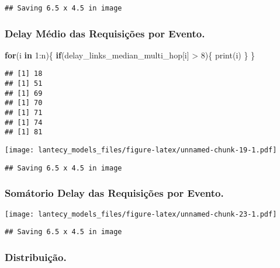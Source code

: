 \documentclass[
]{article}
\newenvironment{Shaded}{\begin{snugshade}}{\end{snugshade}}
\newcommand{\ControlFlowTok}[1]{\textcolor[rgb]{0.13,0.29,0.53}{\textbf{#1}}}
\newcommand{\DecValTok}[1]{\textcolor[rgb]{0.00,0.00,0.81}{#1}}
\newcommand{\FunctionTok}[1]{\textcolor[rgb]{0.00,0.00,0.00}{#1}}
\newcommand{\NormalTok}[1]{#1}
\newcommand{\SpecialCharTok}[1]{\textcolor[rgb]{0.00,0.00,0.00}{#1}}
\begin{document}
\begin{verbatim}
## Saving 6.5 x 4.5 in image
\end{verbatim}

\hypertarget{delay-muxe9dio-das-requisiuxe7uxf5es-por-evento.}{%
\subsubsection{Delay Médio das Requisições por
Evento.}\label{delay-muxe9dio-das-requisiuxe7uxf5es-por-evento.}}

\begin{Shaded}
\begin{Highlighting}[]
\ControlFlowTok{for}\NormalTok{(i }\ControlFlowTok{in} \DecValTok{1}\SpecialCharTok{:}\NormalTok{n)\{}
  \ControlFlowTok{if}\NormalTok{(delay\_links\_median\_multi\_hop[i] }\SpecialCharTok{\textgreater{}} \DecValTok{8}\NormalTok{)\{}
    \FunctionTok{print}\NormalTok{(i)}
\NormalTok{  \}}
\NormalTok{\}}
\end{Highlighting}
\end{Shaded}

\begin{verbatim}
## [1] 18
## [1] 51
## [1] 69
## [1] 70
## [1] 71
## [1] 74
## [1] 81
\end{verbatim}

\texttt{[image: lantecy\_models\_files/figure-latex/unnamed-chunk-19-1.pdf]}

\begin{verbatim}
## Saving 6.5 x 4.5 in image
\end{verbatim}

\hypertarget{somuxe1torio-delay-das-requisiuxe7uxf5es-por-evento.}{%
\subsubsection{Somátorio Delay das Requisições por
Evento.}\label{somuxe1torio-delay-das-requisiuxe7uxf5es-por-evento.}}

\texttt{[image: lantecy\_models\_files/figure-latex/unnamed-chunk-23-1.pdf]}

\begin{verbatim}
## Saving 6.5 x 4.5 in image
\end{verbatim}

\hypertarget{distribuiuxe7uxe3o.-1}{%
\subsubsection{Distribuição.}\label{distribuiuxe7uxe3o.-1}}
\end{document}
